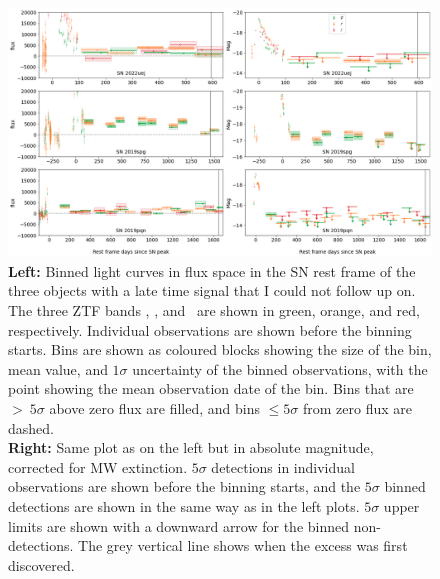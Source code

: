 \documentclass[a4paper,oneside,12pt, class=Latex/Classes/PhDthesisPSnPDF, crop=false]{standalone}
\begin{document}
\begin{figure}
    \centering
    \includegraphics[width=\textwidth]{../Images/chapter_5/non_followup_lcs.png}
    \caption{\textbf{Left:} Binned light curves in flux space in the SN rest frame of the three objects with a late time signal that I could not follow up on. The three ZTF bands \ztfg, \ztfr, and \ztfi\ are shown in green, orange, and red, respectively. Individual observations are shown before the binning starts. Bins are shown as coloured blocks showing the size of the bin, mean value, and $1\sigma$ uncertainty of the binned observations, with the point showing the mean observation date of the bin. Bins that are $>\ 5\sigma$ above zero flux are filled, and bins $\leq5\sigma$ from zero flux are dashed.\\
    \textbf{Right:} Same plot as on the left but in absolute magnitude, corrected for MW extinction. $5\sigma$ detections in individual observations are shown before the binning starts, and the $5\sigma$ binned detections are shown in the same way as in the left plots. $5\sigma$ upper limits are shown with a downward arrow for the binned non-detections. The grey vertical line shows when the excess was first discovered.}
    \label{non_followup_lcs}
\end{figure}
\end{document}
